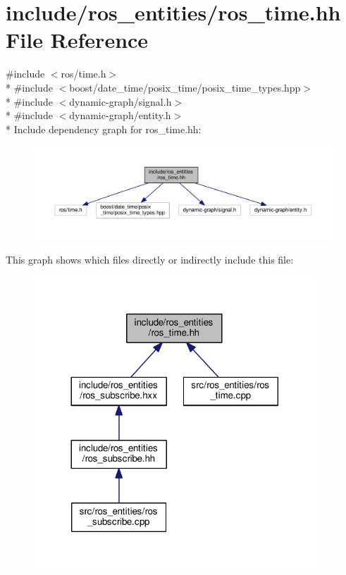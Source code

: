 \hypertarget{ros__time_8hh}{}\section{include/ros\+\_\+entities/ros\+\_\+time.hh File Reference}
\label{ros__time_8hh}
{\ttfamily \#include $<$ros/time.\+h$>$}\\*
{\ttfamily \#include $<$boost/date\+\_\+time/posix\+\_\+time/posix\+\_\+time\+\_\+types.\+hpp$>$}\\*
{\ttfamily \#include $<$dynamic-\/graph/signal.\+h$>$}\\*
{\ttfamily \#include $<$dynamic-\/graph/entity.\+h$>$}\\*
Include dependency graph for ros\+\_\+time.\+hh\+:
\nopagebreak
\begin{figure}[H]
\begin{center}
\leavevmode
\includegraphics[width=350pt]{ros__time_8hh__incl}
\end{center}
\end{figure}
This graph shows which files directly or indirectly include this file\+:
\nopagebreak
\begin{figure}[H]
\begin{center}
\leavevmode
\includegraphics[width=300pt]{ros__time_8hh__dep__incl}
\end{center}
\end{figure}
